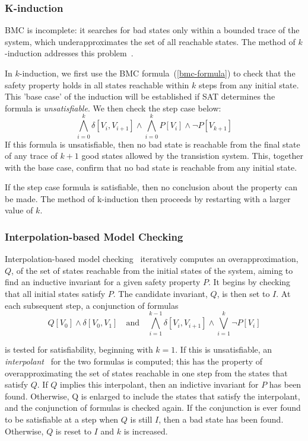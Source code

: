 \subsubsection{K-induction} 

BMC is incomplete: it searches for bad states only within a bounded trace of the system, 
which underapproximates the set of  all reachable states.  The method of 
$k$-induction addresses this problem~\cite{fmcad2000}.
  
In $k$-induction, we first use the BMC formula~(\ref{bmc-formula}) to check that the safety property
holds in all states reachable within $k$ steps from any initial state. This 'base case' of the induction will be established if SAT determines the formula is \textit{unsatisfiable}. We then check the step case below: 
%
\[\bigwedge_{i{=}0}^{k}\delta[V_i, V_{i+1}] \wedge \bigwedge_{i{=}0}^{k} P[V_i] \wedge \neg P[V_{k+1}] \]
%
If this formula is unsatisfiable, then no bad state is reachable from the final state of any trace of $k{+}1$ good states
allowed by the transistion system. This, together with the base case, confirm that no bad state is reachable from any initial state.

If the step case formula is satisfiable, then no conclusion about the property can be made. The method of k-induction then proceeds by restarting with a larger value of $k$. 


\subsubsection{Interpolation-based Model Checking} 

Interpolation-based model checking~\cite{cav03} iteratively computes an overapproximation, $Q$, of the set of states reachable from the initial states of the system, aiming to find an inductive invariant for a given safety property $P$. It begins by checking that all initial states satisfy $P$. The candidate invariant, $Q$, is then set to $I$. At each subsequent step, a conjunction of formulas
%
\[ Q[V_0] \wedge \delta[V_0,V_1] \quad\textrm{and}\quad
\bigwedge_{i{=}1}^{k{-}1}\delta[V_i, V_{i+1}] \wedge 
\bigvee_{i{=}1}^{k} \neg P[V_i] \]

\noindent is tested for satisfiability, beginning with $k{=}1$. If this is unsatisfiable, an \textit{interpolant}~\cite{mc} for the two formulas is computed; this has the property of overapproximating the set of states reachable in one step from the states that satisfy $Q$. If $Q$ implies this interpolant, then an indictive invariant for $P$ has been found. Otherwise, Q is enlarged to include the states that satisfy the interpolant, and the conjunction of formulas is checked again. If the conjunction is ever found to be satisfiable at a step when $Q$ is still $I$, then a bad state has been found. Otherwise, $Q$ is reset to $I$ and $k$ is increased.


